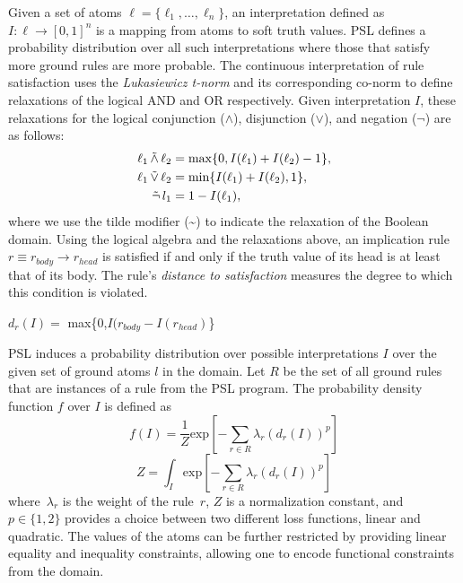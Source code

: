 Given a set of atoms 
$\ell = \{\ell_1,\ldots,\ell_n\}$,
an interpretation defined as 
$I : \ell \rightarrow [0,1]^n$
is a mapping from atoms to soft truth values.
PSL defines a probability distribution over all such interpretations where those that satisfy more ground rules are more probable.
The continuous interpretation of rule satisfaction uses the \emph{Lukasiewicz t-norm} and its corresponding co-norm to define relaxations of the logical AND and OR respectively.
Given interpretation $\mathit{I}$, these relaxations for the logical conjunction ($\wedge$), disjunction ($\vee$), and negation ($\neg$) are as follows:
\begin{align*}
\ell_1 \softand \ell_2 &= \max\{0, I(\ell_1) + I(\ell_2) - 1\},\\
\ell_1 \softor \ell_2 &= \min\{I(\ell_1) + I(\ell_2), 1\},\\
\softneg l_1 &= 1 - I(\ell_1),
\end{align*}  
where we use the tilde modifier (\textasciitilde) to indicate the relaxation of the Boolean domain.
Using the logical algebra and the relaxations above, 
an implication rule $\mathit{r} \equiv \mathit{r_{body}} \rightarrow \mathit{r_{head}} $ is satisfied if and only if the truth value of its head is at least that of its body. The rule's \emph{distance to satisfaction} measures the degree to which this condition is violated.
\begin{center} 
 $\mathit{d_r}(\mathit{I}) =$ max\{0,$\mathit{I(r_{body}} - \mathit{I(r_{head})}$\}
 \end{center}
PSL induces a probability distribution over possible interpretations $\mathit{I}$ over the given set of ground atoms $\mathit{l} $ in the domain. 
Let $\mathit{R}$ be the set of all ground rules that are instances of a rule from the PSL program.  
The probability density function $\mathit{f}$ over $\mathit{I}$ is defined as
\begin{equation}
\label{eq:contimn1}
    f (I) = \frac{1}{Z} \text{exp}[-\sum_{r\in R} \lambda_r (d_r(I))^p]
\end{equation}
\begin{equation}
\label{eq:contimn2}
	Z = \int_{I} \text{exp} [ -\sum_{r\in R} \lambda_r (d_r(I))^p ]
\end{equation}
where~$\lambda_r$ is the weight of the rule~$r$, $Z$ is a normalization constant, and ~$p \in \{1, 2\}$ provides a choice between two different loss functions, linear and quadratic.
The values of the atoms can be further restricted by providing linear equality and inequality constraints, allowing one to encode functional constraints from the domain.

